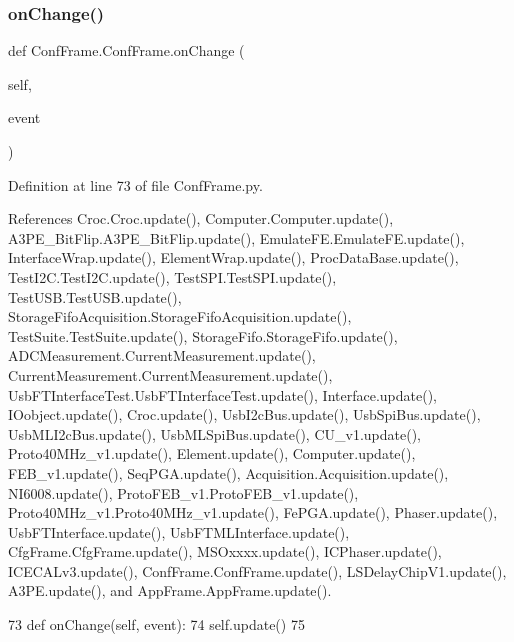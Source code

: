 \subsubsection{\texorpdfstring{on\+Change()}{onChange()}}
{\footnotesize\ttfamily def Conf\+Frame.\+Conf\+Frame.\+on\+Change (\begin{DoxyParamCaption}\item[{}]{self,  }\item[{}]{event }\end{DoxyParamCaption})}



Definition at line 73 of file Conf\+Frame.\+py.



References Croc.\+Croc.\+update(), Computer.\+Computer.\+update(), A3\+P\+E\+\_\+\+Bit\+Flip.\+A3\+P\+E\+\_\+\+Bit\+Flip.\+update(), Emulate\+F\+E.\+Emulate\+F\+E.\+update(), Interface\+Wrap.\+update(), Element\+Wrap.\+update(), Proc\+Data\+Base.\+update(), Test\+I2\+C.\+Test\+I2\+C.\+update(), Test\+S\+P\+I.\+Test\+S\+P\+I.\+update(), Test\+U\+S\+B.\+Test\+U\+S\+B.\+update(), Storage\+Fifo\+Acquisition.\+Storage\+Fifo\+Acquisition.\+update(), Test\+Suite.\+Test\+Suite.\+update(), Storage\+Fifo.\+Storage\+Fifo.\+update(), A\+D\+C\+Measurement.\+Current\+Measurement.\+update(), Current\+Measurement.\+Current\+Measurement.\+update(), Usb\+F\+T\+Interface\+Test.\+Usb\+F\+T\+Interface\+Test.\+update(), Interface.\+update(), I\+Oobject.\+update(), Croc.\+update(), Usb\+I2c\+Bus.\+update(), Usb\+Spi\+Bus.\+update(), Usb\+M\+L\+I2c\+Bus.\+update(), Usb\+M\+L\+Spi\+Bus.\+update(), C\+U\+\_\+v1.\+update(), Proto40\+M\+Hz\+\_\+v1.\+update(), Element.\+update(), Computer.\+update(), F\+E\+B\+\_\+v1.\+update(), Seq\+P\+G\+A.\+update(), Acquisition.\+Acquisition.\+update(), N\+I6008.\+update(), Proto\+F\+E\+B\+\_\+v1.\+Proto\+F\+E\+B\+\_\+v1.\+update(), Proto40\+M\+Hz\+\_\+v1.\+Proto40\+M\+Hz\+\_\+v1.\+update(), Fe\+P\+G\+A.\+update(), Phaser.\+update(), Usb\+F\+T\+Interface.\+update(), Usb\+F\+T\+M\+L\+Interface.\+update(), Cfg\+Frame.\+Cfg\+Frame.\+update(), M\+S\+Oxxxx.\+update(), I\+C\+Phaser.\+update(), I\+C\+E\+C\+A\+Lv3.\+update(), Conf\+Frame.\+Conf\+Frame.\+update(), L\+S\+Delay\+Chip\+V1.\+update(), A3\+P\+E.\+update(), and App\+Frame.\+App\+Frame.\+update().


\begin{DoxyCode}
73     \textcolor{keyword}{def }onChange(self, event):
74         self.update()
75 
\end{DoxyCode}
\mbox{\label{classConfFrame_1_1ConfFrame_a15511ec80bb3c5ce4a99aeb78af41c15}} 
